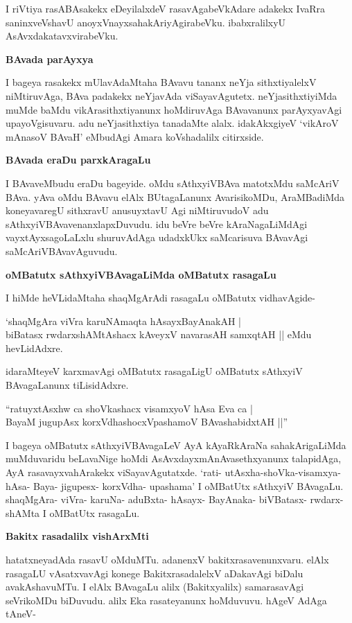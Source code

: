 I riVtiya rasABAsakekx eDeyilalxdeV rasavAgabeVkAdare adakekx IvaRra saninxveVshavU anoyxVnayxsahakAriyAgirabeVku. ibabxralilxyU AsAvxdakatavxvirabeVku.

{\bf BAvada parAyxya}

I bageya rasakekx mUlavAdaMtaha BAvavu tananx neYja sithxtiyalelxV niMtiruvAga, BAva padakekx neYjavAda viSayavAgutetx. neYjasithxtiyiMda muMde baMdu vikArasithxtiyanunx hoMdiruvAga BAvavanunx parAyxyavAgi upayoVgisuvaru. adu neYjasithxtiya tanadaMte alalx. idakAkxgiyeV `vikAroV mAnasoV BAvaH' eMbudAgi Amara koVshadalilx citirxside.

{\bf BAvada eraDu parxkAragaLu}

I BAvaveMbudu eraDu bageyide. oMdu sAthxyiVBAva matotxMdu saMcAriV BAva. yAva oMdu BAvavu elAlx BUtagaLanunx AvarisikoMDu, AraMBadiMda koneyavaregU sithxravU anusuyxtavU Agi niMtiruvudoV adu sAthxyiVBAvavenanxlapxDuvudu. idu beVre beVre kAraNagaLiMdAgi vayxtAyxsagoLaLxlu shuruvAdAga udadxkUkx saMcarisuva BAvavAgi saMcAriVBAvavAguvudu.

{\bf oMBatutx sAthxyiVBAvagaLiMda oMBatutx rasagaLu}

I hiMde heVLidaMtaha shaqMgArAdi rasagaLu oMBatutx vidhavAgide-

\begin{shloka}
`shaqMgAra viVra karuNAmaqta hAsayxBayAnakAH |\\
biBatasx rwdarxshAMtAshacx kAveyxV navarasAH samxqtAH || eMdu hevLidAdxre.
\end{shloka}

idaraMteyeV karxmavAgi oMBatutx rasagaLigU oMBatutx sAthxyiV BAvagaLanunx tiLisidAdxre.

\begin{shloka}
``ratuyxtAsxhw ca shoVkashacx visamxyoV hAsa Eva ca |\\
BayaM jugupAsx korxVdhashocxVpashamoV BAvashabidxtAH ||''
\end{shloka}

I bageya oMBatutx sAthxyiVBAvagaLeV AyA kAyaRkAraNa sahakArigaLiMda muMduvaridu beLavaNige hoMdi AsAvxdayxmAnAvasethxyanunx talapidAga, AyA rasavayxvahArakekx viSayavAgutatxde. `rati- utAsxha-shoVka-visamxya- hAsa- Baya- jigupesx- korxVdha- upashama' I oMBatUtx sAthxyiV BAvagaLu. shaqMgAra- viVra- karuNa- aduBxta- hAsayx- BayAnaka- biVBatasx- rwdarx- shAMta I oMBatUtx rasagaLu.

{\bf Bakitx rasadalilx vishArxMti}

hatatxneyadAda rasavU oMduMTu. adanenxV bakitxrasavenunxvaru. elAlx rasagaLU vAsatxvavAgi konege BakitxrasadalelxV aDakavAgi biDalu avakAshavuMTu. I elAlx BAvagaLu alilx (Bakitxyalilx) samarasavAgi seVrikoMDu biDuvudu. alilx Eka rasateyanunx hoMduvuvu. hAgeV AdAga tAneV-

